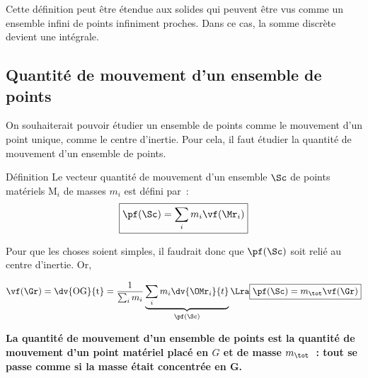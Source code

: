 \documentclass[../main/main.tex]{subfiles}
\begin{document}
Cette définition peut être étendue aux solides qui peuvent être vus comme un
ensemble infini de points infiniment proches. Dans ce cas, la somme discrète
devient une intégrale.

\subsection{Quantité de mouvement d'un ensemble de points}

On souhaiterait pouvoir étudier un ensemble de points comme le mouvement d'un
point unique, comme le centre d'inertie. Pour cela, il faut étudier la quantité
de mouvement d'un ensemble de points.

\begin{tdefi}{Définition}
    Le vecteur quantité de mouvement d'un ensemble $\Sc$ de points matériels
    M$_i$ de masses $m_i$ est défini par~:
    \[\boxed{\pf(\Sc) = \sum_i m_i \vf(\Mr_i)}\]
\end{tdefi}

Pour que les choses soient simples, il faudrait donc que $\pf(\Sc)$ soit relié
au centre d'inertie. Or,

\[
    \vf(\Gr) = \dv{\rm OG}{t} = \frac{1}{\sum_i m_i} \underbrace{\sum_i m_i
    \dv{{\OMr}_i}{t}}_{\pf(\Sc)}
    \Lra
    \boxed{\pf(\Sc) = m_{\tot}\vf(\Gr)}
\]

\begin{bror}{}
    \centering\bfseries
    La quantité de mouvement d'un ensemble de points est la quantité de
    mouvement d'un point matériel placé en $G$ et de masse $m_{\tot}$~: tout se
    passe comme si la masse était concentrée en G.
\end{bror}
\end{document}
